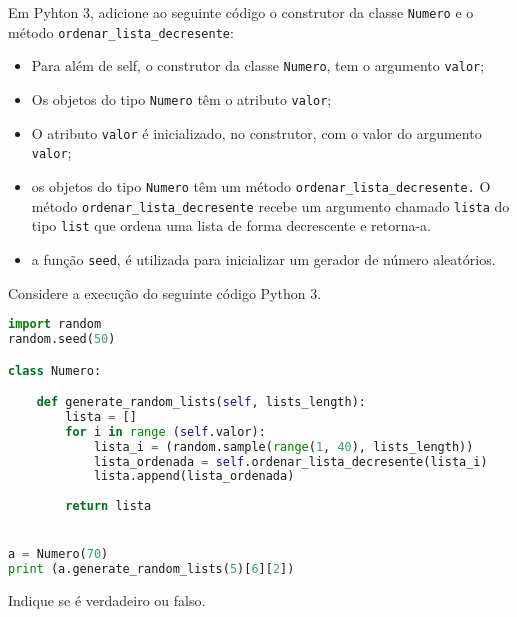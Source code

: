 \documentclass[12pt,varwidth=16cm,border=17pt]{standalone}
\begin{document}
Em Pyhton 3, adicione ao seguinte código o construtor da classe \verb+Numero+ e o método \verb+ordenar_lista_decresente+:

\begin{itemize}

  \item Para além de self, o construtor da classe \verb+Numero+, tem o argumento \verb+valor+;
  \item Os objetos do tipo \verb+Numero+ têm o atributo \verb+valor+;
  \item O atributo \verb+valor+ é inicializado, no construtor, com o valor
  do argumento \verb+valor+;
  \item os objetos do tipo \verb+Numero+ têm um método \verb+ordenar_lista_decresente.+ O
    método \verb+ordenar_lista_decresente+ recebe um argumento chamado \verb+lista+ do tipo
  \verb+list+ que ordena uma lista de forma decrescente e retorna-a.
    
  \item a função \verb+seed+, é utilizada para inicializar um gerador de número aleatórios.
    
\end{itemize}

Considere a execução do seguinte código Python 3.


\begin{lstlisting}[language=Python]
import random
random.seed(50)

class Numero:

    def generate_random_lists(self, lists_length):
        lista = []
        for i in range (self.valor):
            lista_i = (random.sample(range(1, 40), lists_length))
            lista_ordenada = self.ordenar_lista_decresente(lista_i)
            lista.append(lista_ordenada)
        
        return lista


a = Numero(70)
print (a.generate_random_lists(5)[6][2])
\end{lstlisting}

Indique se é verdadeiro ou falso.
\end{document}
